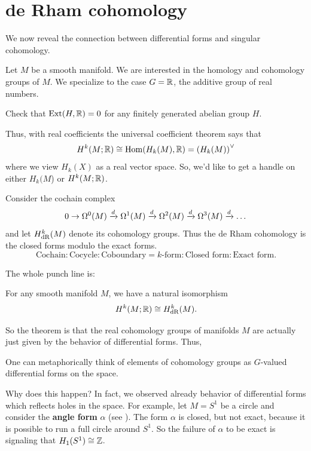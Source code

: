 \section{de Rham cohomology}
\label{sec:de_rham_cohom}
We now reveal the connection between
differential forms and singular cohomology.

Let $M$ be a smooth manifold.
We are interested in the homology and cohomology groups of $M$.
We specialize to the case $G = \mathbb R$, the additive group of real numbers.
\begin{ques}
	Check that $\operatorname{Ext}(H, \mathbb R) = 0$ for any finitely generated abelian group $H$.
\end{ques}
Thus, with real coefficients the universal coefficient theorem says that
\[ H^k(M; \mathbb R) \cong \operatorname{Hom}(H_k(M), \mathbb R) = \left( H_k(M) \right)^\vee \]
where we view $H_k(X)$ as a real vector space.
So, we'd like to get a handle on either $H_k(M$) or $H^k(M; \mathbb R)$.

Consider the cochain complex
\[
	0 \to \Omega^0(M)
	\xrightarrow{d} \Omega^1(M)
	\xrightarrow{d} \Omega^2(M)
	\xrightarrow{d} \Omega^3(M)
	\xrightarrow{d} \dots
\]
and let $H_{\mathrm{dR}}^k(M)$ denote its cohomology groups.
Thus the de Rham cohomology is the closed forms modulo the exact forms.
\[
	\text{Cochain} : \text{Cocycle} : \text{Coboundary}
	= \text{$k$-form} : \text{Closed form} : \text{Exact form}.
\]

The whole punch line is:
\begin{theorem}
	For any smooth manifold $M$, we have a natural isomorphism
	\[ H^k(M; \mathbb R) \cong H_{\mathrm{dR}}^k(M). \]
\end{theorem}
So the theorem is that the real cohomology groups of manifolds $M$
are actually just given by the behavior of differential forms.
Thus,
\begin{moral}
	One can metaphorically think of elements of cohomology groups
	as $G$-valued differential forms on the space.
\end{moral}

Why does this happen?
In fact, we observed already behavior of differential
forms which reflects holes in the space.
For example, let $M = S^1$ be a circle
and consider the \textbf{angle form} $\alpha$
(see ).
The form $\alpha$ is closed, but not exact,
because it is possible to run a full circle around $S^1$.
So the failure of $\alpha$ to be exact is signaling
that $H_1(S^1) \cong \mathbb Z$.

